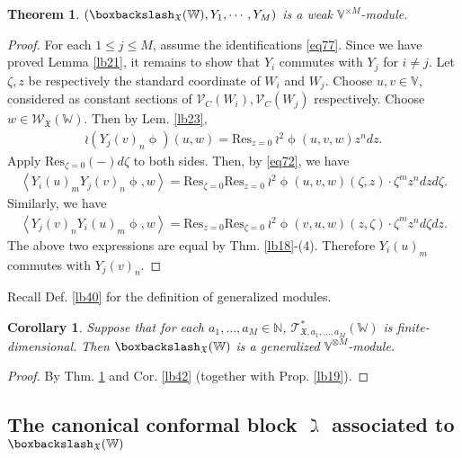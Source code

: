 \documentclass[11pt,b5paper,notitlepage]{article}
\theoremstyle{definition}
\theoremstyle{plain}
\newtheorem{thm}[df]{Theorem}
\newtheorem{co}[df]{Corollary}
\newcommand{\fk}{\mathfrak}
\newcommand{\Res}{\mathrm{Res}}
\newcommand{\SV}{\mathscr{V}}
\newcommand{\scr}{\mathscr}
\newcommand{\Vbb}{\mathbb V}
\newcommand{\Wbb}{\mathbb W}
\newcommand{\Nbb}{\mathbb N}
\newcommand{\<}{\left\langle}
\renewcommand{\>}{\right\rangle}
\newcommand{\fx}{\mathfrak{X}}
\newcommand{\bbs}{\boxbackslash}
\numberwithin{equation}{subsection}
\begin{document}
\begin{thm}\label{lb43}
    $(\boxbackslash_\fx(\Wbb),Y_1,\cdots,Y_M)$ is a weak $\Vbb^{\times M}$-module.
\end{thm}
\begin{proof}
For each $1\leq j\leq M$, assume the identifications \eqref{eq77}.   Since we have proved Lemma \ref{lb21},  it remains to show that $Y_i$ commutes with $Y_j$ for $i\ne j$. Let $\zeta,z$ be respectively the standard coordinate of $W_i$ and $W_j$. Choose $u,v\in \Vbb$, considered as constant sections of $\SV_C(W_i),\SV_C(W_j)$ respectively. Choose $w\in\scr W_{\fk X}(\Wbb)$. Then by Lem. \ref{lb23},
\begin{align*}
\wr(Y_j(v)_n\upphi)(u,w)=\Res_{z=0}~{\wr^2\upphi}(u,v,w)z^n dz.
\end{align*}
Apply $\Res_{\zeta=0}(-)d\zeta$ to both sides.  Then, by \eqref{eq72}, we have
\begin{align}
\<Y_i(u)_mY_j(v)_n\upphi,w\>=\Res_{\zeta=0}\Res_{z=0}~{\wr^2 \upphi}(u,v,w)(\zeta,z)\cdot \zeta^m z^n dzd\zeta.
\end{align}
    Similarly, we have
\begin{align*}
\<Y_j(v)_nY_i(u)_m\upphi,w\>=\Res_{z=0}\Res_{\zeta=0}~{\wr^2 \upphi}(v,u,w)(z,\zeta)\cdot \zeta^m z^n d\zeta dz.
\end{align*}
The above two expressions are equal by Thm. \ref{lb18}-(4). Therefore $Y_i(u)_m$ commutes with $Y_j(v)_n$.
\end{proof}




Recall Def. \ref{lb40} for the definition of generalized modules. 

\begin{co}\label{lb44}
Suppose that for each $a_1,\dots,a_M\in\Nbb$, $\scr T_{\fk X,a_1,\dots,a_M}^*(\Wbb)$ is finite-dimensional. Then $\bbs_\fx(\Wbb)$ is a generalized $\Vbb^{\otimes M}$-module.
\end{co}

\begin{proof}
By Thm. \ref{lb43} and Cor. \ref{lb42} (together with Prop. \ref{lb19}).
\end{proof}










\subsection{The canonical conformal block $\gimel$ associated to $\boxbackslash_{\fx}(\Wbb)$}  \label{lb58}
\end{document}

